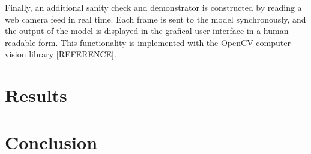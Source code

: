 \documentclass{article}
\begin{document}
Finally, an additional sanity check and demonstrator is constructed by
reading a web camera feed in real time. Each frame is sent to the
model synchronously, and the output of the model is displayed in the
grafical user interface in a human-readable form. This functionality
is implemented with the OpenCV computer vision library [REFERENCE].

\section{Results}\label{sec:results}

\section{Conclusion}\label{sec:conclusion}

\small




%

\vfill\pagebreak
\end{document}
